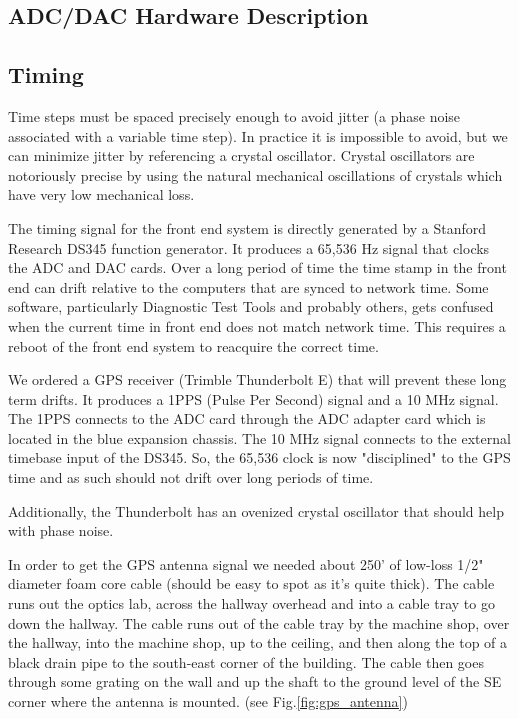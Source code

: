 \subsection{ADC/DAC Hardware Description}

\subsection{Timing}

Time steps must be spaced precisely enough to avoid jitter (a phase noise
associated with a variable time step). In practice it is impossible to
avoid, but we can minimize jitter by referencing a crystal oscillator.
Crystal oscillators are notoriously precise by using the natural mechanical 
oscillations of crystals which have very low mechanical loss.

The timing signal for the front end system is directly generated by a Stanford Research DS345 function generator. It produces a 65,536 Hz signal that clocks the ADC and DAC cards. Over a long period of time the time stamp in the front end can drift relative to the computers that are synced to network time. Some software, particularly Diagnostic Test Tools and probably others, gets confused when the current time in front end does not match network time. This requires a reboot of the front end system to reacquire the correct time.

We ordered a GPS receiver (Trimble Thunderbolt E) that will prevent these long term drifts. It produces a 1PPS (Pulse Per Second) signal and a 10 MHz signal. The 1PPS connects to the ADC card through the ADC adapter card which is located in the blue expansion chassis. The 10 MHz signal connects to the external timebase input of the DS345. So, the 65,536 clock is now "disciplined" to the GPS time and as such should not drift over long periods of time.

Additionally, the Thunderbolt has an ovenized crystal oscillator that should help with phase noise.

In order to get the GPS antenna signal we needed about 250' of low-loss 1/2" diameter foam core cable (should be easy to spot as it's quite thick). The cable runs out the optics lab, across the hallway overhead and into a cable tray to go down the hallway. The cable runs out of the cable tray by the machine shop, over the hallway, into the machine shop, up to the ceiling, and then along the top of a black drain pipe to the south-east corner of the building. The cable then goes through some grating on the wall and up the shaft to the ground level of the SE corner where the antenna is mounted. (see Fig.\ref{fig:gps_antenna})


